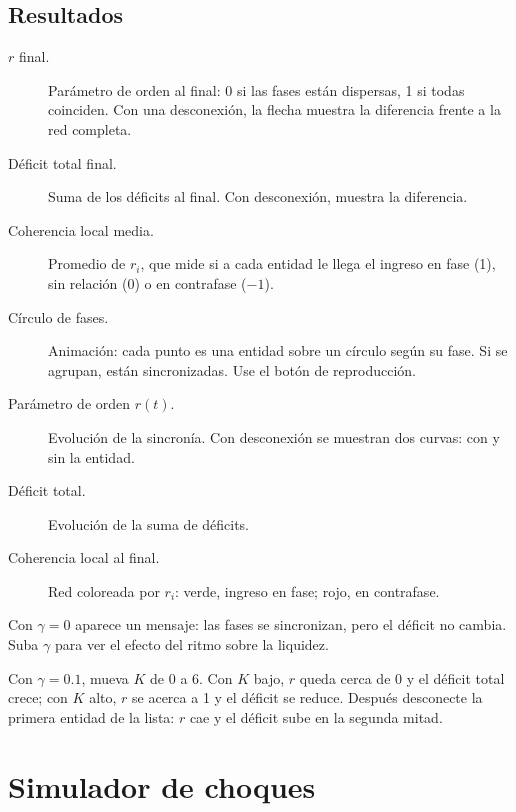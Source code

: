 \subsection*{Resultados}
\begin{description}
\item[$r$ final.] Parámetro de orden al final: 0 si las fases están dispersas, 1 si todas
coinciden. Con una desconexión, la flecha muestra la diferencia frente a la red
completa.
\item[Déficit total final.] Suma de los déficits al final. Con desconexión, muestra la
diferencia.
\item[Coherencia local media.] Promedio de $r_i$, que mide si a cada entidad le llega el
ingreso en fase (1), sin relación (0) o en contrafase ($-1$).
\item[Círculo de fases.] Animación: cada punto es una entidad sobre un círculo según su
fase. Si se agrupan, están sincronizadas. Use el botón de reproducción.
\item[Parámetro de orden $r(t)$.] Evolución de la sincronía. Con desconexión se muestran
dos curvas: con y sin la entidad.
\item[Déficit total.] Evolución de la suma de déficits.
\item[Coherencia local al final.] Red coloreada por $r_i$: verde, ingreso en fase; rojo,
en contrafase.
\end{description}


\begin{aviso}
Con $\gamma=0$ aparece un mensaje: las fases se sincronizan, pero el déficit no cambia.
Suba $\gamma$ para ver el efecto del ritmo sobre la liquidez.
\end{aviso}

\begin{pruebe}
Con $\gamma=0.1$, mueva $K$ de 0 a 6. Con $K$ bajo, $r$ queda cerca de 0 y el déficit
total crece; con $K$ alto, $r$ se acerca a 1 y el déficit se reduce. Después desconecte la
primera entidad de la lista: $r$ cae y el déficit sube en la segunda mitad.
\end{pruebe}

\section{Simulador de choques}


